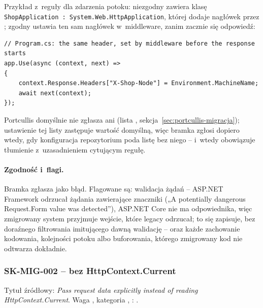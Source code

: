Przykład z~reguły dla zdarzenia potoku: niezgodny  zawiera klasę
\texttt{ShopApplication : System.Web.HttpApplication}, której
 dodaje nagłówek  przez
; zgodny ustawia ten sam nagłówek w~middleware, zanim zacznie
się odpowiedź:

\begin{lstlisting}
// Program.cs: the same header, set by middleware before the response starts
app.Use(async (context, next) =>
{
    context.Response.Headers["X-Shop-Node"] = Environment.MachineName;
    await next(context);
});
\end{lstlisting}

Portcullis domyślnie nie zgłasza  ani
 (lista ,
sekcja~\ref{sec:portcullis-migracja}); ustawienie tej listy zastępuje wartość domyślną,
więc bramka zgłosi  dopiero wtedy, gdy konfiguracja repozytorium poda
listę bez niego -- i~wtedy obowiązuje tłumienie z~uzasadnieniem cytującym regułę.

\paragraph{Zgodność i~flagi.} Bramka zgłasza  jako błąd.
Flagowane są: walidacja żądań -- ASP.NET Framework odrzucał żądania zawierające znaczniki
(„A potentially dangerous Request.Form value was detected”), ASP.NET Core nie ma
odpowiednika, więc zmigrowany system przyjmuje wejście, które legacy odrzucał; to się
zapisuje, bez doraźnego filtrowania imitującego dawną walidację -- oraz każde zachowanie
kodowania, kolejności potoku albo buforowania, którego zmigrowany kod nie odtwarza dokładnie.


\subsubsection{SK-MIG-002 -- bez HttpContext.Current}\label{sec:standardy-sk-mig-002}

Tytuł źródłowy: \emph{Pass request data explicitly instead of reading HttpContext.Current}.
Waga , kategoria , :
.

